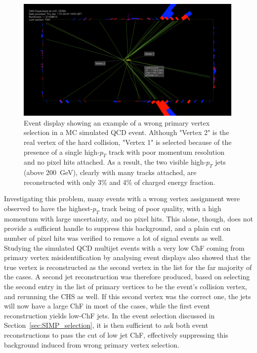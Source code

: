 \begin{figure}[ht]
  \centering
  \includegraphics[width=0.99\textwidth]{figures/wrongvertex.png}
  \caption{Event display showing an example of a wrong primary vertex selection in a MC simulated \ac{QCD} event. Although "Vertex 2" is the real vertex of the hard collision, "Vertex 1" is selected because of the presence of a single high-$p_T$ track with poor momentum resolution and no pixel hits attached. As a result, the two visible high-$p_T$ jets (above \SI{200}{GeV}), clearly with many tracks attached, are reconstructed with only 3\% and 4\% of charged energy fraction.}
  \label{fig:wrongvertex}
\end{figure} 

Investigating this problem, many events with a wrong vertex assignment were observed to have the highest-$p_T$ track being of poor quality, with a high momentum with large uncertainty, and no pixel hits. This alone, though, does not provide a sufficient handle to suppress this background, and a plain cut on number of pixel hits was verified to remove a lot of signal events as well.
Studying the simulated \ac{QCD} multijet events with a very low ChF coming from primary vertex misidentification by analysing event displays also showed that the true vertex is reconstructed as the second vertex in the list for the far majority of the cases. A second jet reconstruction was therefore produced, based on selecting the second entry in the list of primary vertices to be the event's collision vertex, and rerunning the \ac{CHS} as well. If this second vertex was the correct one, the jets will now have a large ChF in most of the cases, while the first event reconstruction yields low-ChF jets. In the event selection discussed in Section~\ref{sec:SIMP_selection}, it is then sufficient to ask both event reconstructions to pass the cut of low jet ChF, effectively suppressing this background induced from wrong primary vertex selection.

